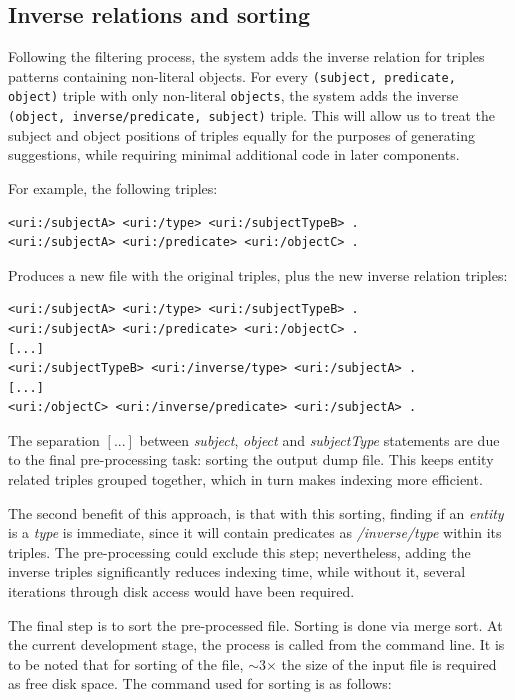 \subsection{Inverse relations and sorting}

Following the filtering process, the system adds the inverse relation for triples patterns containing non-literal objects. 
For every \texttt{(subject, predicate, object)} triple with only non-literal \texttt{objects}, the system adds the inverse \texttt{(object, inverse/predicate, subject)} triple. This will allow us to treat the subject and object positions of triples equally for the purposes of generating suggestions, while requiring minimal additional code in later components.

\begin{example}
For example, the following triples:

\begin{verbatim}
<uri:/subjectA> <uri:/type> <uri:/subjectTypeB> .
<uri:/subjectA> <uri:/predicate> <uri:/objectC> .
\end{verbatim}

Produces a new file with the original triples, plus the new inverse relation triples:

\begin{verbatim}
<uri:/subjectA> <uri:/type> <uri:/subjectTypeB> .
<uri:/subjectA> <uri:/predicate> <uri:/objectC> .
[...]
<uri:/subjectTypeB> <uri:/inverse/type> <uri:/subjectA> .
[...]
<uri:/objectC> <uri:/inverse/predicate> <uri:/subjectA> .
\end{verbatim}

The separation $[...]$ between \textit{subject}, \textit{object} and \textit{subjectType} statements are due to the final pre-processing task: sorting the output dump file. 
This keeps entity related triples grouped together, which in turn makes indexing more efficient.

\end{example}

The second benefit of this approach, is that with this sorting, finding if an \textit{entity} is a \textit{type} is immediate, since it will contain predicates as \textit{/inverse/type} within its triples. 
The pre-processing could exclude this step; nevertheless, adding the inverse triples significantly reduces indexing time, while without it, several iterations through disk access would have been required. 

The final step is to sort the pre-processed file. Sorting is done via merge sort. At the current development stage, the process is called from the command line. It is to be noted that for sorting of the file, $\sim$3$\times$ the size of the input file is required as free disk space. The command used for sorting is as follows: 

